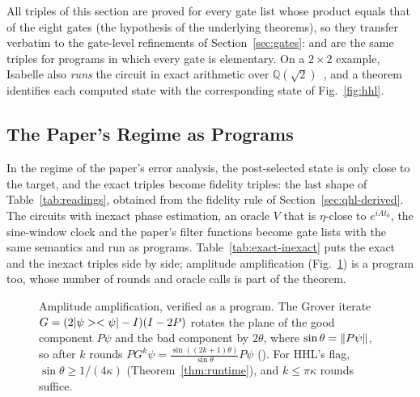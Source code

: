 All triples of this section are proved for every gate list whose product equals that of the eight
gates (the hypothesis  of the underlying theorems), so they transfer verbatim to the gate-level
refinements of Section~\ref{sec:gates}:  and  are the
same triples for programs in which every gate is elementary. On a $2\times2$ example, Isabelle also
\emph{runs} the circuit in exact arithmetic over $\mathbb Q(\sqrt2)$~\cite{thiemann2014realimpl}, and a
theorem identifies each computed state with the corresponding state of
Fig.~\ref{fig:hhl}.

\subsection{The Paper's Regime as Programs}\label{sec:approx-programs}

In the regime of the paper's error analysis, the post-selected state is only close to the target, and
the exact triples become fidelity triples: the last shape of Table~\ref{tab:readings}, obtained from the
fidelity rule of Section~\ref{sec:qhl-derived}. The circuits with inexact phase estimation, an oracle
$V$ that is $\eta$-close to $e^{iAt_0}$, the sine-window clock and the paper's filter functions become
gate lists with the same semantics and run as programs. Table~\ref{tab:exact-inexact} puts the exact
and the inexact triples side by side; amplitude amplification (Fig.~\ref{fig:aa}) is a program too, whose
number of rounds and oracle calls is part of the theorem.

\begin{figure}[t]
\centering
{}
\caption{Amplitude amplification, verified as a program. The Grover iterate $G=(2|\psi>< \psi|-I)(I-2P)$
rotates the plane of the good component $P\psi$ and the bad component by $2\theta$, where
$\sin\theta=\|P\psi\|$, so after $k$ rounds $PG^k\psi=\frac{\sin((2k+1)\theta)}{\sin\theta}P\psi$
(). For HHL's flag, $\sin\theta\ge1/(4\kappa)$ (Theorem~\ref{thm:runtime}), and
$k\le\pi\kappa$ rounds suffice.}\label{fig:aa}
\end{figure}

